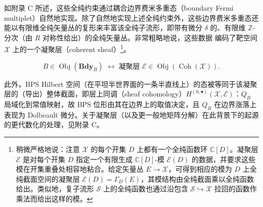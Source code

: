 
如附录 C 所述，这些全纯约束通过耦合边界费米多重态（boundary Fermi multiplet）自然地实现。除了自然地实现上述全纯约束外，这些边界费米多重态还能以有限维全纯矢量丛的复形来丰富该全纯子流形，即带有微分 $\delta$ 的、有限维 $\mathbb{Z}$-分次（由 $R$ 对称性给出）的全纯矢量丛。非常粗略地说，这些数据%
编码了靶空间 $\mathcal{X}$ 上的一个凝聚层（coherent sheaf）\footnote{稍微严格地说：注意 $\mathcal{X}$ 的每个开集 $D$ 上都有一个全纯函数环 $\mathbb{C}[D]$。凝聚层 $\mathcal{E}$ 是对每个开集 $D$ 指定一个有限生成 $\mathbb{C}[D]$-模 $\mathcal{E}(D)$ 的数据，并要求这些模在开集重叠处相容地粘合。给定矢量丛 $E\to\mathcal{X}$，可得到相应的模为 $D$ 上全纯截面空间的凝聚层 $\mathcal{E}(D)=\Gamma_D(E)$，其模结构由全纯截面乘以全纯函数给出。类似地，复子流形 $\mathcal{S}$ 上的全纯函数也通过沿包含 $\mathcal{S}\hookrightarrow\mathcal{X}$ 拉回的函数作乘法而给出这样的模。}。

\begin{equation}
B\in\operatorname{Obj}(\mathbf{Bdy}_B)\;\leftrightarrow\;\text{凝聚层 }\mathcal{E}\in\operatorname{Obj}(\operatorname{Coh}(\mathcal{X})).
\tag{2.44}
\end{equation}

此外，BPS Hilbert 空间（在平坦半世界面的一条半直线上）的态被等同于该凝聚层的（导出）整体截面，即层上同调（sheaf cohomology）$H^{(0,\bullet)}(\mathcal{X},\mathcal{E})$：$Q_B$ 局域化到常值映射，故 BPS 位形由其在边界上的取值决定，且 $Q_B$ 在边界涨落上表现为 Dolbeault 微分。关于凝聚层（以及更一般地矩阵分解）在此背景下的起源的更代数化的处理，见附录 C。


